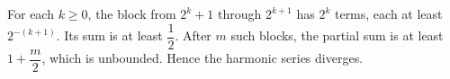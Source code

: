 For each $k\ge0$, the block from $2^k+1$ through $2^{k+1}$ has $2^k$ terms, each at least $2^{-(k+1)}$. Its sum is at least $\dfrac{1}{2}$. After $m$ such blocks, the partial sum is at least $1+\dfrac{m}{2}$, which is unbounded. Hence the harmonic series diverges.
